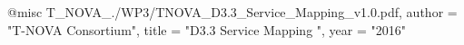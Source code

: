 @misc{ T_NOVA_./WP3/TNOVA_D3.3_Service_Mapping_v1.0.pdf,
       author = "{T-NOVA Consortium}",
       title = "D3.3 Service Mapping ",
       year = "2016" }
